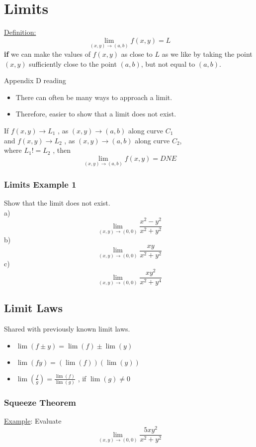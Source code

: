 \documentclass[12pt]{article}
\begin{document}
\section{Limits}
\underline{Definition:}\[
	\lim_{(x,y) \to (a,b)} f(x,y) = L
\]
\textbf{if} we can make the values of \(f(x,y)\) as close to \(L\) as we like by taking the point \((x,y)\) sufficiently close to the point \((a,b)\), but not equal to \((a,b)\). 

Appendix D reading

\begin{itemize}
	\item There can often be many ways to approach a limit.
	\item Therefore, easier to show that a limit does not exist.
\end{itemize}
If \(f(x,y)\rightarrow L_1\) , as \((x,y)\rightarrow (a,b)\)  along curve \(C_1\) \\
and \(f(x,y)\rightarrow L_2\) , as \((x,y)\rightarrow (a,b)\) along curve \(C_2\), \\
where \(L_1 != L_2\) , then \[
	\lim_{(x,y) \to (a,b)} f(x,y) = DNE
\] 

\subsubsection{Limits Example 1}
Show that the limit does not exist.\\
a) \[\lim_{(x,y) \to (0,0)} \frac{x^2-y^2}{x^2+y^2}\] 
b) \[
	\lim_{(x,y) \to (0,0)} \frac{xy}{x^2+y^2} 
\]
c) \[
	\lim_{(x,y) \to (0,0)} \frac{xy^2}{x^2+y^4}
\]

\subsection{Limit Laws}
Shared with previously known limit laws.
\begin{itemize}
	\item \(\lim(f\pm y) = \lim(f) \pm \lim(y) \)
	\item \(\lim(fy) = (\lim(f))(\lim(y))\) 
	\item \(\lim(\frac{f}{g}) = \frac{\lim(f)}{\lim(g)}\) , if \(\lim(g) \ne 0 \) 
\end{itemize}

\subsubsection{Squeeze Theorem}
\underline{Example}: Evaluate \[
	\lim_{(x,y) \to (0,0)} \frac{5xy^2}{x^2+y^2}
\]
\end{document}

